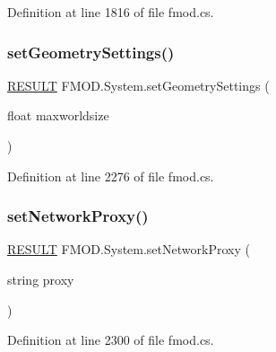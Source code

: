 Definition at line 1816 of file fmod.\+cs.

\mbox{\label{class_f_m_o_d_1_1_system_ae1d0bd2b1542fbcd01621e92103e48f4}} 
\subsubsection{\texorpdfstring{set\+Geometry\+Settings()}{setGeometrySettings()}}
{\footnotesize\ttfamily \hyperlink{namespace_f_m_o_d_a305d1176ef3f8c8815861a60407ac33d}{R\+E\+S\+U\+LT} F\+M\+O\+D.\+System.\+set\+Geometry\+Settings (\begin{DoxyParamCaption}\item[{float}]{maxworldsize }\end{DoxyParamCaption})}



Definition at line 2276 of file fmod.\+cs.

\mbox{\label{class_f_m_o_d_1_1_system_ae1a29c1a626acef24838e5f4048902fa}} 
\subsubsection{\texorpdfstring{set\+Network\+Proxy()}{setNetworkProxy()}}
{\footnotesize\ttfamily \hyperlink{namespace_f_m_o_d_a305d1176ef3f8c8815861a60407ac33d}{R\+E\+S\+U\+LT} F\+M\+O\+D.\+System.\+set\+Network\+Proxy (\begin{DoxyParamCaption}\item[{string}]{proxy }\end{DoxyParamCaption})}



Definition at line 2300 of file fmod.\+cs.

\mbox{\label{class_f_m_o_d_1_1_system_a96ffbfaa42b4cc5733700e769a61f360}} 
